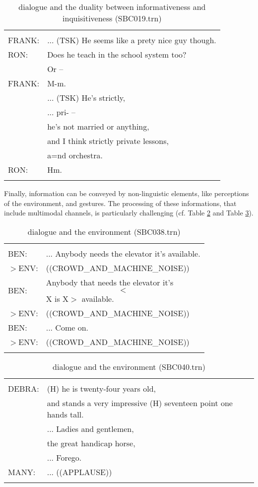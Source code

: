 \documentclass[11pt]{article}
\newenvironment{sbcquote}[2]
{
	\def\savedcaption{\caption{#1}}%
	\def\savedlabel{\label{#2}}%
	\begin{table}[h]
		\centering
		\begin{small}
		\begin{tabular}{ll}
			\hline
			& \\
}
{
	& \\
	\hline
	\end{tabular}
	\end{small}
	\savedcaption
	\savedlabel
\end{table}
}
\begin{document}
			\begin{sbcquote}{dialogue and the duality between informativeness and inquisitiveness (SBC019.trn)}{tab:dial_grounding}
				FRANK: &... (TSK) He seems like a prety nice guy though.\\
				RON: & Does he teach in the school system too?\\
				& Or --\\
				FRANK: & M-m.\\
				& ... (TSK) He's strictly,\\
				& ... pri- --\\
				& he's not married or anything,\\
				& and I think strictly private lessons,\\
				& a=nd orchestra.\\
				RON: & Hm.\\
			\end{sbcquote}

			

			Finally, information can be conveyed by non-linguistic elements, like perceptions of the environment, and gestures. The processing of these informations, that include multimodal channels, is particularly challenging (cf. Table \ref{tab:dial_env1} and Table \ref{tab:dial_env2}).

			\begin{sbcquote}{dialogue and the environment (SBC038.trn)}{tab:dial_env1}
				BEN: &... Anybody needs the elevator it's available.\\
				$>$ENV: & ((CROWD\_AND\_MACHINE\_NOISE))\\
				BEN: & Anybody that needs the elevator it's $$<$$X is X$>$ available.\\
				$>$ENV: & ((CROWD\_AND\_MACHINE\_NOISE))\\
				BEN: & ... Come on.\\
				$>$ENV: & ((CROWD\_AND\_MACHINE\_NOISE))\\
			\end{sbcquote}
			
			\begin{sbcquote}{dialogue and the environment (SBC040.trn)}{tab:dial_env2}
				DEBRA: & (H) he is twenty-four years old,\\
				& and stands a very impressive (H) seventeen point one hands tall.\\
				&... Ladies and gentlemen,\\
				&the great handicap horse,\\
				& ... Forego.\\
				MANY: & ... ((APPLAUSE))\\
			\end{sbcquote}
\end{document}
